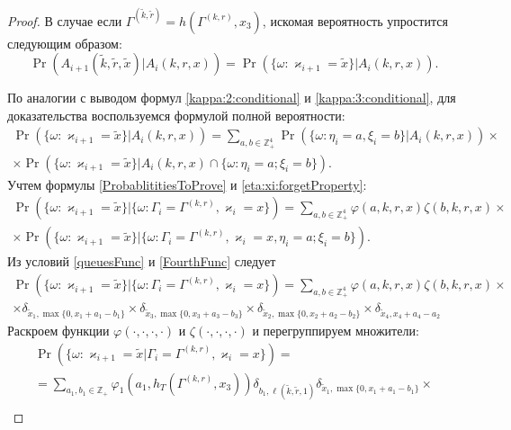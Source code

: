 \documentclass[a4paper,12pt,russian]{extarticle}
\begin{document}
\begin{proof}
В случае если $\Gamma^{(\tilde{k},\tilde{r})}=h(\Gamma^{(k,r)},x_3)$, искомая вероятность упростится следующим образом:
\begin{equation*}
\Pr (A_{i+1}(\tilde{k},\tilde{r},\tilde{x})| A_{i}({k},{r},{x})) 
=\Pr (\{\omega\colon \varkappa_{i+1}=\tilde{x}\}|A_{i}({k},{r},{x})).
\end{equation*}

По аналогии с выводом формул \eqref{kappa:2:conditional} и \eqref{kappa:3:conditional}, для доказательства воспользуемся формулой полной вероятности:
\begin{multline*}
\Pr (\{\omega\colon\varkappa_{i+1}=\tilde{x}\}|A_i(k,r,x) )= \sum_{a,b \in \mathbb{Z}_+^4} \Pr (\{\omega\colon\eta_i=a, \xi_i=b\}|A_i(k,r,x)) \times \\ 
\times
\Pr (\{\omega\colon\varkappa_{i+1}=\tilde{x}\}|A_i(k,r,x) \cap \{\omega\colon \eta_i=a; \xi_i=b\}).
\end{multline*}
Учтем формулы \eqref{ProbablititiesToProve} и \eqref{eta:xi:forgetProperty}:
\begin{multline*}
\Pr (\{\omega\colon \varkappa_{i+1}=\tilde{x}\}|\{\omega\colon\Gamma_{i}=\Gamma^{(k,r)},\varkappa_i=x\})
=\sum_{a,b \in \mathbb{Z}_+^4} \varphi(a,k,r,x) \zeta(b,k,r,x)
\times \\ \times
\Pr (\{\omega\colon\varkappa_{i+1}=\tilde{x}\}|\{\omega\colon\Gamma_{i}=\Gamma^{(k,r)},\varkappa_i=x, \eta_i=a; \xi_i=b\}).
\end{multline*}
Из условий \eqref{queuesFunc} и \eqref{FourthFunc} следует
\begin{multline*}
\Pr (\{\omega\colon\varkappa_{i+1}=\tilde{x}\}|\{\omega\colon\Gamma_{i}=\Gamma^{(k,r)},\varkappa_i=x\})=\sum_{a,b \in \mathbb{Z}_+^4} \varphi(a,k,r,x) \zeta(b,k,r,x)
\times \\ \times \delta_{\tilde{x}_1,\max{\{0,x_1+a_1-b_1\}}} \times 
 \delta_{\tilde{x}_3,\max{\{0,x_3+a_3-b_3\}}} \times
\delta_{\tilde{x}_2,\max{\{0,x_2+a_2-b_2\}}} \times
\delta_{\tilde{x}_4,x_4+a_4-a_2}
\end{multline*}
Раскроем  функции $\varphi(\cdot, \cdot, \cdot, \cdot)$ и $\zeta(\cdot, \cdot, \cdot, \cdot)$ и перегруппируем множители:
\begin{multline*}
\Pr (\{\omega\colon\varkappa_{i+1}=\tilde{x}|\Gamma_{i}=\Gamma^{(k,r)},\varkappa_i=x\})= \\
=\sum_{a_1,b_1 \in \mathbb{Z}_+} \varphi_1(a_1,h_T(\Gamma^{(k,r)},x_3)) \delta_{b_1,\ell(\tilde{k},\tilde{r},1)} \delta_{\tilde{x}_1,\max{\{0,x_1+a_1-b_1\}}} \times \\

\end{multline*}
\end{proof}
\end{document}
